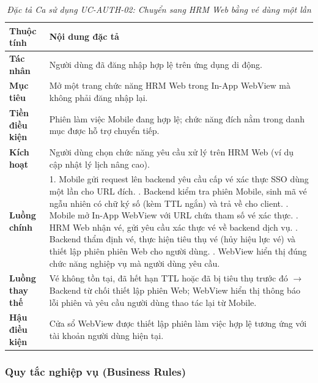 \begin{table}[H]
\centering
\renewcommand{\arraystretch}{1.25}
\begin{tabularx}{\textwidth}{|p{3.2cm}|X|}
\hline
\textbf{Thuộc tính} & \textbf{Nội dung đặc tả} \\
\hline
\textbf{Tác nhân} & Người dùng đã đăng nhập hợp lệ trên ứng dụng di động. \\
\hline
\textbf{Mục tiêu} & Mở một trang chức năng HRM Web trong In-App WebView mà không phải đăng nhập lại. \\
\hline
\textbf{Tiền điều kiện} & Phiên làm việc Mobile đang hợp lệ; chức năng đích nằm trong danh mục được hỗ trợ chuyển tiếp. \\
\hline
\textbf{Kích hoạt} & Người dùng chọn chức năng yêu cầu xử lý trên HRM Web (ví dụ cập nhật lý lịch nâng cao). \\
\hline
\textbf{Luồng chính} & 
1. Mobile gửi request lên backend yêu cầu cấp vé xác thực SSO dùng một lần cho URL đích. \newline
2. Backend kiểm tra phiên Mobile, sinh mã vé ngẫu nhiên có chữ ký số (kèm TTL ngắn) và trả về cho client. \newline
3. Mobile mở In-App WebView với URL chứa tham số vé xác thực. \newline
4. HRM Web nhận vé, gửi yêu cầu xác thực vé về backend dịch vụ. \newline
5. Backend thẩm định vé, thực hiện tiêu thụ vé (hủy hiệu lực vé) và thiết lập phiên phiên Web cho người dùng. \newline
6. WebView hiển thị đúng chức năng nghiệp vụ mà người dùng yêu cầu. \\
\hline
\textbf{Luồng thay thế} & Vé không tồn tại, đã hết hạn TTL hoặc đã bị tiêu thụ trước đó $\rightarrow$ Backend từ chối thiết lập phiên Web; WebView hiển thị thông báo lỗi phiên và yêu cầu người dùng thao tác lại từ Mobile. \\
\hline
\textbf{Hậu điều kiện} & Cửa sổ WebView được thiết lập phiên làm việc hợp lệ tương ứng với tài khoản người dùng hiện tại. \\
\hline
\end{tabularx}
\caption{\textit{Đặc tả Ca sử dụng UC-AUTH-02: Chuyển sang HRM Web bằng vé dùng một lần}}
\label{tab:uc_auth_02}
\end{table}

\subsubsection{Quy tắc nghiệp vụ (Business Rules)}

